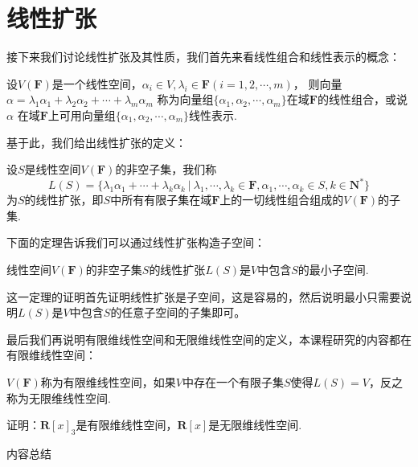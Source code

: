\section{线性扩张}
接下来我们讨论线性扩张及其性质，我们首先来看线性组合和线性表示的概念：
\begin{definition}
	设$V(\mathbf{F})$是一个线性空间，$\alpha_i\in V,\lambda_i\in \mathbf{F}(i=1,2,\cdots,m)$，
	则向量$\alpha=\lambda_1\alpha_1+\lambda_2\alpha_2+\cdots+\lambda_m\alpha_m$
	称为向量组$\{\alpha_1,\alpha_2,\cdots,\alpha_m\}$在域$\mathbf{F}$的线性组合，或说$\alpha$
	在域$\mathbf{F}$上可用向量组$\{\alpha_1,\alpha_2,\cdots,\alpha_m\}$线性表示.
\end{definition}
基于此，我们给出线性扩张的定义：
\begin{definition}
	设$S$是线性空间$V(\mathbf{F})$的非空子集，我们称
	$$L(S)=\{\lambda_1\alpha_1+\cdots+\lambda_k\alpha_k\ |\ \lambda_1,\cdots,\lambda_k\in\mathbf{F},\alpha_1,\cdots,\alpha_k\in S,k\in\mathbf{N^*}\}$$
	为$S$的线性扩张，即$S$中所有有限子集在域$\mathbf{F}$上的一切线性组合组成的$V(\mathbf{F})$的子集.
\end{definition}
下面的定理告诉我们可以通过线性扩张构造子空间：
\begin{theorem}
	线性空间$V(\mathbf{F})$的非空子集$S$的线性扩张$L(S)$是$V$中包含$S$的最小子空间.
\end{theorem}
这一定理的证明首先证明线性扩张是子空间，这是容易的，然后说明最小只需要说明$L(S)$是$V$中包含$S$的任意子空间的子集即可。

最后我们再说明有限维线性空间和无限维线性空间的定义，本课程研究的内容都在有限维线性空间：
\begin{definition}
	$V(\mathbf{F})$称为有限维线性空间，如果$V$中存在一个有限子集$S$使得$L(S)=V$，反之称为无限维线性空间.
\end{definition}
\begin{example}
	证明：$\mathbf{R}[x]_3$是有限维线性空间，$\mathbf{R}[x]$是无限维线性空间.
\end{example}

\vspace{2ex} 
\centerline{\heiti \Large 内容总结}

\vspace{2ex} 

